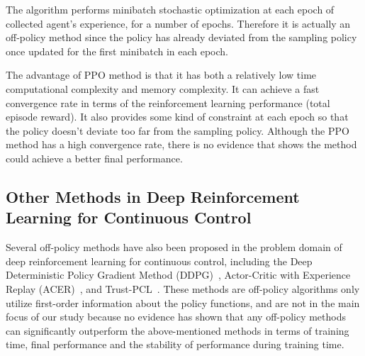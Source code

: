 The algorithm performs minibatch stochastic optimization at each epoch of collected agent's experience, for a number of epochs. Therefore it is actually an off-policy method since the policy has already deviated from the sampling policy once updated for the first minibatch in each epoch.

The advantage of PPO method is that it has both a relatively low time computational complexity and memory complexity. It can achieve a fast convergence rate in terms of the reinforcement learning performance (total episode reward). It also provides some kind of constraint at each epoch so that the policy doesn't deviate too far from the sampling policy. Although the PPO method has a high convergence rate, there is no evidence that shows the method could achieve a better final performance.
\subsection{Other Methods in Deep Reinforcement Learning for Continuous Control}
Several off-policy methods have also been proposed in the problem domain of deep reinforcement learning for continuous control, including the Deep Deterministic Policy Gradient Method (DDPG)~\cite{lillicrap2015continuous}, Actor-Critic with Experience Replay (ACER)~\cite{wang2016sample}, and Trust-PCL~\cite{nachum2017trust}. These methods are off-policy algorithms only utilize first-order information about the policy functions, and are not in the main focus of our study because no evidence has shown that any off-policy methods can significantly outperform the above-mentioned methods in terms of training time, final performance and the stability of performance during training time.
